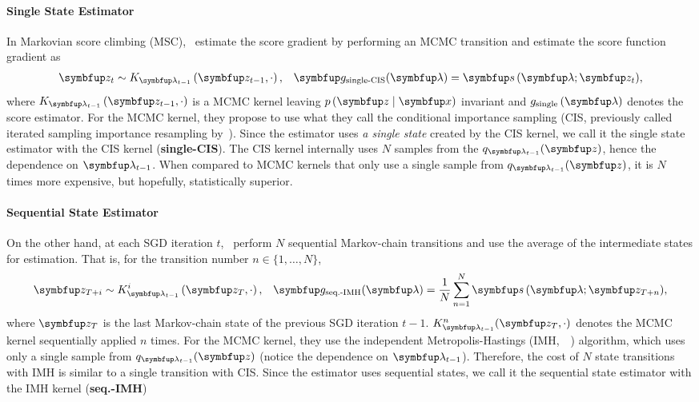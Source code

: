 \vspace{-0.05in}
\paragraph{Single State Estimator}
In Markovian score climbing (MSC),~\citet{NEURIPS2020_b2070693} estimate the score gradient by performing an MCMC transition and estimate the score function gradient as
\vspace{-0.05in}
\begin{align*}
  &\vz_t \sim K_{\vlambda_{t-1}}\left(\vz_{t-1}, \cdot \right),
  &\vg_{\text{single-CIS}}(\vlambda) = \vs\,(\vlambda; \vz_t),
\end{align*}
where \(K_{\vlambda_{t-1}}\left(\vz_{t-1}, \cdot\right)\) is a MCMC kernel leaving \(p\,(\vz\mid\vx)\) invariant and \(g_{\text{single}}\left(\vlambda\right)\) denotes the score estimator.
For the MCMC kernel, they propose to use what they call the conditional importance sampling (CIS, previously called iterated sampling importance resampling by~\citet{andrieu_uniform_2018}).
Since the estimator uses \textit{a single state} created by the CIS kernel, we call it the single state estimator with the CIS kernel (\textbf{single-CIS}).
The CIS kernel internally uses \(N\) samples from the \(q_{\vlambda_{t-1}}(\vz)\), hence the dependence on \(\vlambda_{t-1}\).
When compared to MCMC kernels that only use a single sample from \(q_{\vlambda_{t-1}}(\vz)\), it is \(N\) times more expensive, but hopefully, statistically superior.

\vspace{-0.08in}
\paragraph{Sequential State Estimator}
On the other hand, at each SGD iteration \(t\),~\citet{pmlr-v124-ou20a} perform \(N\) sequential Markov-chain transitions and use the average of the intermediate states for estimation.
That is, for the transition number \(n \in \{1, \ldots, N\}\),
\vspace{-0.05in}
\begin{align*}
  &\vz_{T+i} \sim K_{\vlambda_{t-1}}^i\left(\vz_{T}, \cdot \right),
  &\vg_{\text{seq.-IMH}}(\vlambda) = \frac{1}{N} \sum_{n=1}^N \vs\,(\vlambda; \vz_{T+n}),
\end{align*}
where \(\vz_T\) is the last Markov-chain state of the previous SGD iteration 
\(t-1\).
\(K^{n}_{\vlambda_{t-1}}(\vz_{T}, \cdot)\) denotes the MCMC kernel sequentially applied \(n\) times.
For the MCMC kernel, they use the independent Metropolis-Hastings (IMH,~\citealt[Algorithm 25]{robert_monte_2004}~\citealt{hastings_monte_1970}) algorithm, which uses only a single sample from \(q_{\vlambda_{t-1}}(\vz)\) (notice the dependence on \(\vlambda_{t-1}\)).
Therefore, the cost of \(N\) state transitions with IMH is similar to a single transition with CIS.
Since the estimator uses sequential states, we call it the sequential state estimator with the IMH kernel (\textbf{seq.-IMH})

